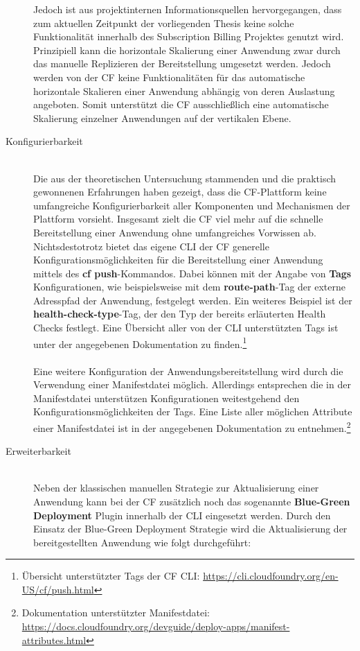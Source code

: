 \begin{description}
	Jedoch ist aus projektinternen Informationsquellen hervorgegangen, dass zum aktuellen Zeitpunkt der vorliegenden Thesis keine solche Funktionalität innerhalb des Subscription Billing Projektes genutzt wird.\\
	Prinzipiell kann die horizontale Skalierung einer Anwendung zwar durch das manuelle Replizieren der Bereitstellung umgesetzt werden. Jedoch werden von der \ac{CF} keine Funktionalitäten für das automatische horizontale Skalieren einer Anwendung abhängig von deren Auslastung angeboten. Somit unterstützt die \ac{CF} ausschließlich eine automatische Skalierung einzelner Anwendungen auf der vertikalen Ebene.
	\item[Konfigurierbarkeit] \hfill \\
	Die aus der theoretischen Untersuchung stammenden und die praktisch gewonnenen Erfahrungen haben gezeigt, dass die \ac{CF}-Plattform keine umfangreiche Konfigurierbarkeit aller Komponenten und Mechanismen der Plattform vorsieht. Insgesamt zielt die \ac{CF} viel mehr auf die schnelle Bereitstellung einer Anwendung ohne umfangreiches Vorwissen ab.\\ 
	Nichtsdestotrotz bietet das eigene \ac{CLI} der \ac{CF} generelle Konfigurationsmöglichkeiten für die Bereitstellung einer Anwendung mittels des \textbf{cf push}-Kommandos. 
	\newpage
	Dabei können mit der Angabe von \textbf{Tags} Konfigurationen, wie beispielsweise mit dem \textbf{route-path}-Tag der externe Adresspfad der Anwendung, festgelegt werden.
	Ein weiteres Beispiel ist der \textbf{health-check-type}-Tag, der den Typ der bereits erläuterten Health Checks festlegt.	Eine Übersicht aller von der \ac{CLI} unterstützten Tags ist unter der angegebenen Dokumentation zu finden.\footnote{Übersicht unterstützter Tags der \ac{CF} \ac{CLI}: \url{https://cli.cloudfoundry.org/en-US/cf/push.html}}\\
	\\
	Eine weitere Konfiguration der Anwendungsbereitstellung wird durch die Verwendung einer Manifestdatei möglich. Allerdings entsprechen die in der Manifestdatei unterstützen Konfigurationen weitestgehend den Konfigurationsmöglichkeiten der Tags. Eine Liste aller möglichen Attribute einer Manifestdatei ist in der angegebenen Dokumentation zu entnehmen.\footnote{Dokumentation unterstützter Manifestdatei: \url{https://docs.cloudfoundry.org/devguide/deploy-apps/manifest-attributes.html}} 
	\item[Erweiterbarkeit] \hfill \\
	Neben der klassischen manuellen Strategie zur Aktualisierung einer Anwendung kann bei der \ac{CF} zusätzlich noch das sogenannte \textbf{Blue-Green Deployment} Plugin innerhalb der \ac{CLI} eingesetzt werden.\autocite[Vgl.][Implementation]{CloudFoundryFoundation.20190422} Durch den Einsatz der Blue-Green Deployment Strategie wird die Aktualisierung der bereitgestellten Anwendung wie folgt durchgeführt:

\end{description}
